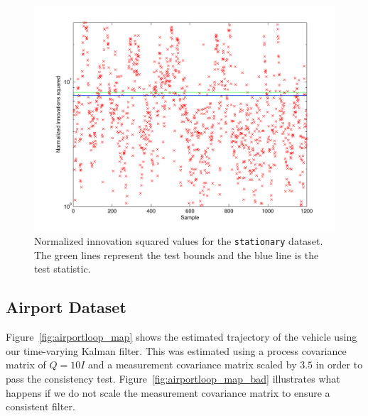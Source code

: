 \begin{figure}
\includegraphics[width=\columnwidth]{nis_stationary}
\caption{Normalized innovation squared values for the \texttt{stationary} dataset.  The green lines represent the test bounds and the blue line is the test statistic.}
\label{fig:nis_stationary}
\end{figure}



\subsection{Airport Dataset}
Figure~\ref{fig:airportloop_map} shows the estimated trajectory of the vehicle using our time-varying Kalman filter.  This was estimated using a process covariance matrix of $Q = 10I$ and a measurement covariance matrix scaled by $3.5$ in order to pass the consistency test.  Figure~\ref{fig:airportloop_map_bad} illustrates what happens if we do not scale the measurement covariance matrix to ensure a consistent filter.

